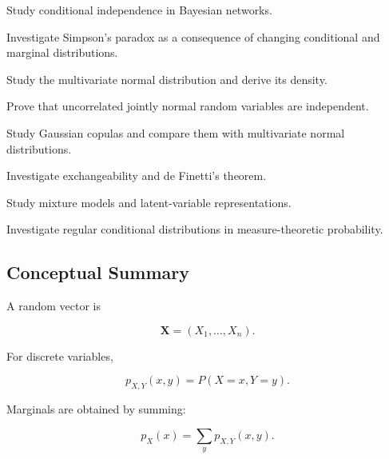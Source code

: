 \begin{exercise}[4]
Study conditional independence in Bayesian networks.
\end{exercise}

\begin{exercise}[4]
Investigate Simpson's paradox as a consequence of changing conditional
and marginal distributions.
\end{exercise}

\begin{exercise}[4]
Study the multivariate normal distribution and derive its density.
\end{exercise}

\begin{exercise}[4]
Prove that uncorrelated jointly normal random variables are independent.
\end{exercise}

\begin{exercise}[4]
Study Gaussian copulas and compare them with multivariate normal
distributions.
\end{exercise}

\begin{exercise}[4]
Investigate exchangeability and de Finetti's theorem.
\end{exercise}

\begin{exercise}[4]
Study mixture models and latent-variable representations.
\end{exercise}

\begin{exercise}[4]
Investigate regular conditional distributions in measure-theoretic
probability.
\end{exercise}

\subsection{Conceptual Summary}
\label{subsec:joint-distributions-summary}

A random vector is

\[
\boxed{
\mathbf{X}
=
(X_1,\ldots,X_n).
}
\]

For discrete variables,

\[
\boxed{
p_{X,Y}(x,y)
=
P(X=x,Y=y).
}
\]

Marginals are obtained by summing:

\[
\boxed{
p_X(x)
=
\sum_y
p_{X,Y}(x,y).
}
\]

